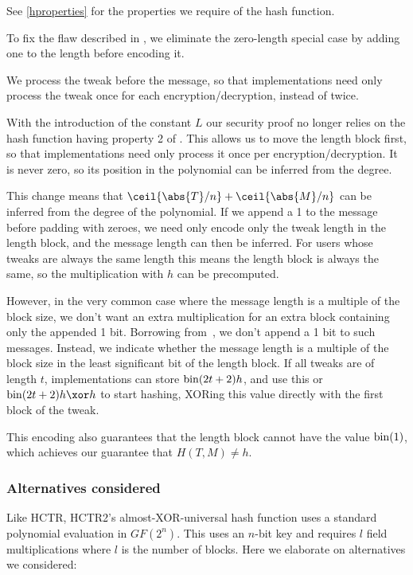 \documentclass[hctr.tex]{subfiles}
\begin{document}
See \autoref{hproperties}
for the properties we require of the hash function.

To fix the flaw described in \cite{kumarhctr},
we eliminate the zero-length special case
by adding one to the length before encoding it.

We process the tweak before the message, so that implementations need only
process the tweak once for each encryption/decryption, instead of twice.

With the introduction of the constant \(L\)
our security proof no longer relies on the hash function
having property 2 of \cite[Section~3.3]{hctr}.
This allows us to move the length block first, so
that implementations need only process it once per encryption/decryption.
It is never zero, so its position in the
polynomial can be inferred from the degree.

This change means that \(\ceil{\abs{T}/n} + \ceil{\abs{M}/n}\)
can be inferred from the degree of the polynomial.  
If we append a 1 to the message before padding with zeroes,
we need only encode only the tweak length in the length block,
and the message length can then be inferred.
For users whose tweaks are always the same length
this means the length block is always the same, 
so the multiplication with \(h\) can be
precomputed.

However, in the very common case where 
the message length is a multiple of the block size,
we don't want an extra multiplication
for an extra block containing only the appended 1 bit.
Borrowing from~\cite{xcbc},
we don't append a 1 bit to such messages.
Instead, we indicate whether
the message length is a multiple of the block size
in the least significant bit of the length block.
If all tweaks are of length \(t\), implementations can store
\(\operatorname{bin}(2t + 2)h\), and use this or \(\fromint(2t + 2)h \xor h\)
to start hashing, XORing this value directly with the
first block of the tweak.

This encoding also guarantees that the length block
cannot have the value \(\operatorname{bin}(1)\), which achieves
our guarantee that \(H(T, M) \neq h\).

\subsubsection{Alternatives considered}

Like HCTR, HCTR2's almost-XOR-universal hash function uses a standard polynomial
evaluation in $GF(2^n)$. This uses an $n$-bit key and requires $l$ field
multiplications where $l$ is the number of blocks. Here we elaborate on
alternatives we considered:
\end{document}
